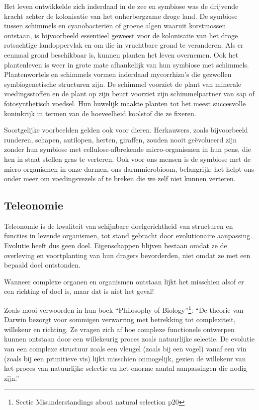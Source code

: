 \documentclass[
  11pt,
]{book}
\begin{document}
Het leven ontwikkelde zich inderdaad in de zee en symbiose was de drijvende kracht achter de kolonisatie van het onherbergzame droge land. De symbiose tussen schimmels en cyanobacteriën of groene algen waaruit korstmossen ontstaan, is bijvoorbeeld essentieel geweest voor de kolonisatie van het droge rotsachtige landoppervlak en om die in vruchtbare grond te veranderen.
Als er eenmaal grond beschikbaar is, kunnen planten het leven overnemen. Ook het plantenleven is weer in grote mate afhankelijk van hun symbiose met schimmels. Plantenwortels en schimmels vormen inderdaad mycorrhiza's die gezwollen symbiogenetische structuren zijn. De schimmel voorziet de plant van minerale voedingsstoffen en de plant op zijn beurt voorziet zijn schimmelpartner van sap of fotosynthetisch voedsel. Hun huwelijk maakte planten tot het meest succesvolle koninkrijk in termen van de hoeveelheid koolstof die ze fixeren.

Soortgelijke voorbeelden gelden ook voor dieren. Herkauwers, zoals bijvoorbeeld runderen, schapen, antilopen, herten, giraffen, zouden nooit geëvolueerd zijn zonder hun symbiose met cellulose-afbrekende micro-organismen in hun pens, die hen in staat stellen gras te verteren. Ook voor ons mensen is de symbiose met de micro-organismen in onze darmen, ons darmmicrobioom, belangrijk: het helpt ons onder meer om voedingsvezels af te breken die we zelf niet kunnen verteren.

\subsection{Teleonomie}\label{teleonomie}

Teleonomie is de kwaliteit van schijnbare doelgerichtheid van structuren en functies in levende organismen, tot stand gebracht door evolutionaire aanpassing. Evolutie heeft dus geen doel. Eigenschappen blijven bestaan omdat ze de overleving en voortplanting van hun dragers bevorderden, niet omdat ze met een bepaald doel ontstonden.

Wanneer complexe organen en organismen ontstaan lijkt het misschien alsof er een richting of doel is, maar dat is niet het geval!

Zoals \citet{rosenberg2008} mooi verwoorden in hun boek ``Philosophy of Biology''\footnote{Sectie Misunderstandings about natural selection p20}: ``De theorie van Darwin bezorgt voor sommigen verwarring met betrekking tot complexiteit, willekeur en richting. Ze vragen zich af hoe complexe functionele ontwerpen kunnen ontstaan door een willekeurig proces zoals natuurlijke selectie. De evolutie van een complexe structuur zoals een vleugel (zoals bij een vogel) vanaf een vin (zoals bij een primitieve vis) lijkt misschien onmogelijk, gezien de willekeur van het proces van natuurlijke selectie en het enorme aantal aanpassingen die nodig zijn.''
\end{document}
